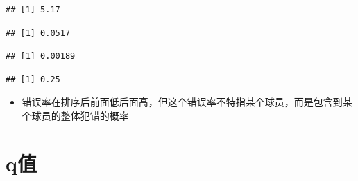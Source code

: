 \documentclass[]{book}
\newenvironment{Shaded}{\begin{snugshade}}{\end{snugshade}}
\newcommand{\CommentTok}[1]{\textcolor[rgb]{0.56,0.35,0.01}{\textit{#1}}}
\newcommand{\DecValTok}[1]{\textcolor[rgb]{0.00,0.00,0.81}{#1}}
\newcommand{\KeywordTok}[1]{\textcolor[rgb]{0.13,0.29,0.53}{\textbf{#1}}}
\newcommand{\NormalTok}[1]{#1}
\newcommand{\OperatorTok}[1]{\textcolor[rgb]{0.81,0.36,0.00}{\textbf{#1}}}
\newcommand{\StringTok}[1]{\textcolor[rgb]{0.31,0.60,0.02}{#1}}
\providecommand{\tightlist}{%
  \setlength{\itemsep}{0pt}\setlength{\parskip}{0pt}}
\begin{document}
\begin{verbatim}
## [1] 5.17
\end{verbatim}

\begin{Shaded}
\end{Shaded}

\begin{verbatim}
## [1] 0.0517
\end{verbatim}

\begin{Shaded}
\end{Shaded}

\begin{verbatim}
## [1] 0.00189
\end{verbatim}

\begin{Shaded}
\end{Shaded}

\begin{verbatim}
## [1] 0.25
\end{verbatim}

\begin{itemize}
\tightlist
\item
  错误率在排序后前面低后面高，但这个错误率不特指某个球员，而是包含到某个球员的整体犯错的概率
\end{itemize}

\hypertarget{qux503c}{%
\section{q值}\label{qux503c}}
\end{document}
